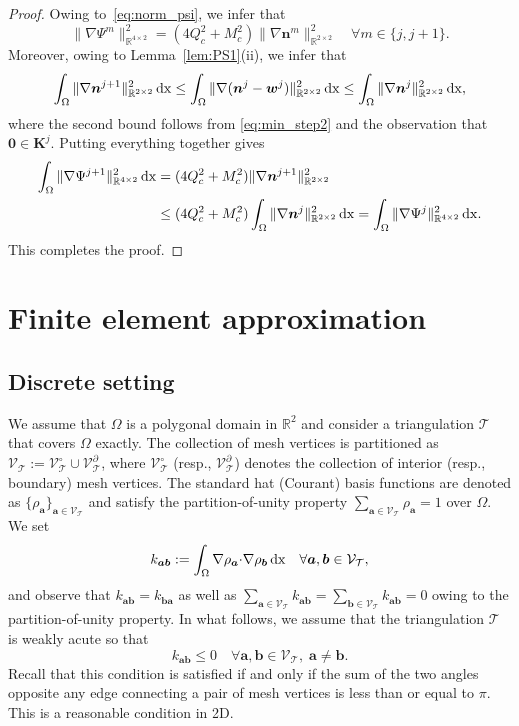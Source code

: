 \documentclass[a4paper,11pt]{article}
\theoremstyle{definition}
\theoremstyle{remark}
\numberwithin{equation}{section}
\newcommand{\dx}{\,{\rm dx}}
\newcommand{\Real}{\mathbb{R}}
\newcommand{\ba}{{\boldsymbol a}}
\newcommand{\bb}{{\boldsymbol b}}
\newcommand{\bn}{{\boldsymbol n}}
\newcommand{\bw}{{\boldsymbol w}}
\newcommand{\bK}{{\boldsymbol K}}
\newcommand{\bzero}{{\boldsymbol 0}}
\newcommand{\calT}{\mathcal{T}}
\newcommand{\calV}{\mathcal{V}}
\newcommand{\SCAL}{{\cdot}}
\newcommand{\vertex}{\calV_\calT}
\newcommand{\vertexi}{\calV_\calT^\circ}
\newcommand{\vertexb}{\calV_\calT^\partial}
\begin{document}
\begin{proof}
Owing to~\eqref{eq:norm_psi}, we infer that 
\[
\|\nabla\Psi^{m}\|_{\Real^{4\times 2}}^2
= (4Q_c^2+M_c^2) \|\nabla \bn^m\|_{\Real^{2\times 2}}^2 \quad \forall m\in\{j,j+1\}.
\] 
Moreover, owing to Lemma~\ref{lem:PS1}(ii), we infer that
\[
\int_\Omega \|\nabla \bn^{j+1}\|_{\Real^{2\times2}}^2 \dx \le
\int_\Omega \|\nabla (\bn^{j}-\bw^j)\|_{\Real^{2\times2}}^2 \dx \le
\int_\Omega \|\nabla \bn^{j}\|_{\Real^{2\times2}}^2 \dx,
\]
where the second bound follows from \eqref{eq:min_step2} and the observation that $\bzero \in \bK^j$. Putting everything together gives
\begin{align*}
\int_\Omega \|\nabla\Psi^{j+1}\|_{\Real^{4\times 2}}^2 \dx
&= (4Q_c^2+M_c^2) \|\nabla \bn^{j+1}\|_{\Real^{2\times 2}}^2 \\
&\le (4Q_c^2+M_c^2)  \int_\Omega \|\nabla \bn^{j}\|_{\Real^{2\times2}}^2 \dx 
=\int_\Omega \|\nabla\Psi^{j}\|_{\Real^{4\times 2}}^2 \dx.
\end{align*}
This completes the proof.
\end{proof}


\section{Finite element approximation}
\label{sec:FEM}

\subsection{Discrete setting}

We assume that $\Omega$ is a polygonal domain in $\Real^2$ and consider a triangulation $\calT$ that covers $\Omega$ exactly. The collection of mesh vertices is partitioned as $\vertex:=\vertexi \cup \vertexb$, where $\vertexi$ (resp., $\vertexb$) denotes the collection of interior (resp., boundary) mesh vertices. The standard hat (Courant) basis functions are denoted as $\{\rho_{\ba}\}_{\ba \in\vertex}$ and satisfy the partition-of-unity property $\sum_{\ba\in \vertex} \rho_{\ba} =1$ over $\Omega$. We set
\begin{equation} \label{eq:def_kab}
k_{\ba\bb} := \int_\Omega \nabla \rho_{\ba} \SCAL \nabla \rho_{\bb} \dx
\quad \forall \ba,\bb \in \vertex,
\end{equation}
and observe that $k_{\ba\bb}=k_{\bb\ba}$ as well as 
$\sum_{\ba\in \vertex} k_{\ba\bb}= \sum_{\bb\in \vertex} k_{\ba\bb} = 0$
owing to the partition-of-unity property. 
In what follows, we assume that the triangulation $\calT$ is weakly acute \cite{Xu1999,Qiang:1998:GL,Brandts2009}  so that
\begin{equation} \label{eq:DMP}
k_{\ba\bb} \le 0 \quad \forall \ba,\bb \in \vertex, \; \ba\ne\bb.
\end{equation}
Recall that this condition is satisfied if and only if the sum of the two angles opposite any edge connecting a pair of mesh vertices is less than or equal to $\pi$. This is a reasonable condition in 2D.
\end{document}
